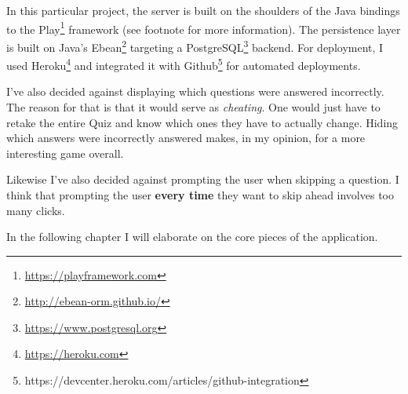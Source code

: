 \documentclass[english,a4paper,]{report}
\DeclareRobustCommand{\href}[2]{#2\footnote{\url{#1}}}
\begin{document}
In this particular project, the server is built on the shoulders of the
Java bindings to the \href{https://playframework.com}{Play} framework
(see footnote for more information). The persistence layer is built on
Java's \href{http://ebean-orm.github.io/}{Ebean} targeting a
\href{https://www.postgresql.org}{PostgreSQL} backend. For deployment, I
used \href{https://heroku.com}{Heroku} and integrated it with
Github\footnote{https://devcenter.heroku.com/articles/github-integration}
for automated deployments.

I've also decided against displaying which questions were answered
incorrectly. The reason for that is that it would serve as
\emph{cheating}. One would just have to retake the entire Quiz and know
which ones they have to actually change. Hiding which answers were
incorrectly answered makes, in my opinion, for a more interesting game
overall.

Likewise I've also decided against prompting the user when skipping a
question. I think that prompting the user \textbf{every time} they want
to skip ahead involves too many clicks.

In the following chapter I will elaborate on the core pieces of the
application.
\end{document}
